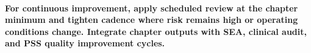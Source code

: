 \paragraph{For continuous improvement, apply scheduled review at the chapter minimum and tighten cadence where risk remains high or operating conditions change. Integrate chapter outputs with SEA, clinical audit, and PSS quality improvement cycles.}


